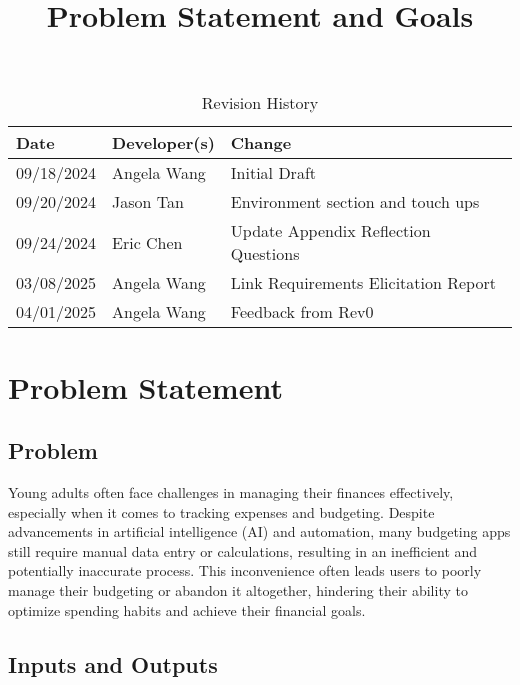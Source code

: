 \documentclass{article}
\title{Problem Statement and Goals\\\progname}
\author{\authname}
\date{}
\begin{document}
\maketitle

\begin{table}[hp]
\caption{Revision History} \label{TblRevisionHistory}
\begin{tabularx}{\textwidth}{llX}
\toprule
\textbf{Date} & \textbf{Developer(s)} & \textbf{Change}\\
\midrule
09/18/2024 & Angela Wang & Initial Draft\\
09/20/2024 & Jason Tan & Environment section and touch ups\\
09/24/2024 & Eric Chen & Update Appendix Reflection Questions\\
03/08/2025 & Angela Wang & Link Requirements Elicitation Report\\
04/01/2025 & Angela Wang & Feedback from Rev0 \\
\bottomrule
\end{tabularx}
\end{table}

\section{Problem Statement}



\subsection{Problem}

Young adults often face challenges in managing their finances effectively,
especially when it comes to tracking expenses and budgeting. Despite
advancements in artificial intelligence (AI) and automation, many budgeting apps
still require manual data entry or calculations, resulting in an inefficient and
potentially inaccurate process. This inconvenience often leads users to poorly
manage their budgeting or abandon it altogether, hindering their ability to
optimize spending habits and achieve their financial goals.


\subsection{Inputs and Outputs}
\end{document}
